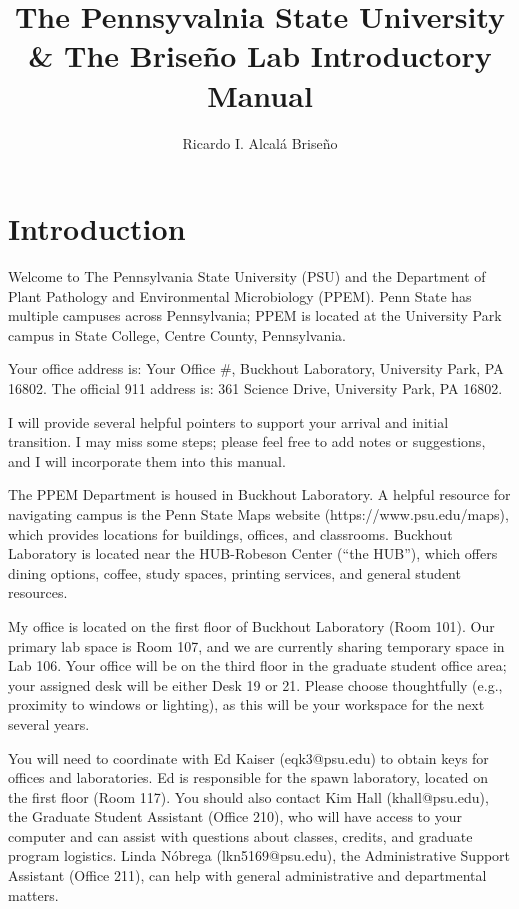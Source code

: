 \documentclass[11pt, oneside]{article}   	%
\title{The Pennsyvalnia State University \\
 \Large \& The Briseño Lab Introductory Manual}
\author{Ricardo I. Alcalá Briseño}
\date{}							%
\begin{document}
\maketitle

\section{Introduction}
Welcome to The Pennsylvania State University (PSU) and the Department of Plant Pathology and Environmental Microbiology (PPEM). Penn State has multiple campuses across Pennsylvania; PPEM is located at the University Park campus in State College, Centre County, Pennsylvania.

Your office address is:
Your Office #, Buckhout Laboratory, University Park, PA 16802.
The official 911 address is:
361 Science Drive, University Park, PA 16802.

I will provide several helpful pointers to support your arrival and initial transition. I may miss some steps; please feel free to add notes or suggestions, and I will incorporate them into this manual.

The PPEM Department is housed in Buckhout Laboratory. A helpful resource for navigating campus is the Penn State Maps website (https://www.psu.edu/maps), which provides locations for buildings, offices, and classrooms. Buckhout Laboratory is located near the HUB-Robeson Center (“the HUB”), which offers dining options, coffee, study spaces, printing services, and general student resources.

My office is located on the first floor of Buckhout Laboratory (Room 101). Our primary lab space is Room 107, and we are currently sharing temporary space in Lab 106. Your office will be on the third floor in the graduate student office area; your assigned desk will be either Desk 19 or 21. Please choose thoughtfully (e.g., proximity to windows or lighting), as this will be your workspace for the next several years.

You will need to coordinate with Ed Kaiser (eqk3@psu.edu) to obtain keys for offices and laboratories. Ed is responsible for the spawn laboratory, located on the first floor (Room 117). You should also contact Kim Hall (khall@psu.edu), the Graduate Student Assistant (Office 210), who will have access to your computer and can assist with questions about classes, credits, and graduate program logistics. Linda Nóbrega (lkn5169@psu.edu), the Administrative Support Assistant (Office 211), can help with general administrative and departmental matters.
\end{document}

